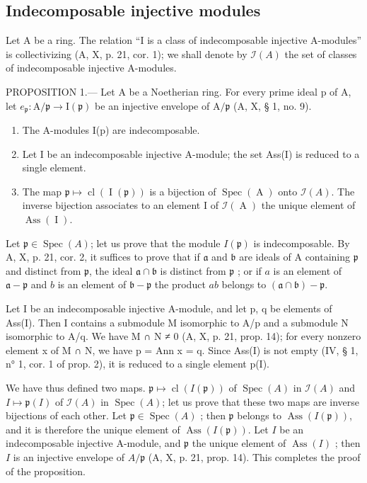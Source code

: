 \subsection{Indecomposable injective modules}

Let A be a ring. The relation “I is a class of indecomposable injective A-modules” is collectivizing (A, X, p. 21, cor. 1); we shall denote by \(\mathcal{I}(A)\) the set of classes of indecomposable injective A-modules.

PROPOSITION 1.--- Let A be a Noetherian ring. For every prime ideal p of A, let \(e_{\mathfrak{p}}: \mathrm{A}/\mathfrak{p} \to \mathrm{I}(\mathfrak{p})\) be an injective envelope of \(\mathrm{A}/\mathfrak{p}\) (A, X, § 1, no. 9).

\begin{enumerate}
\def\labelenumi{\alph{enumi})}
\item
  The A-modules I(p) are indecomposable.
\item
  Let I be an indecomposable injective A-module; the set Ass(I) is reduced to a single element.
\item
  The map \(\mathfrak{p} \mapsto \operatorname{cl}(\operatorname{I}(\mathfrak{p}))\) is a bijection of \(\operatorname{Spec}(\operatorname{A})\) onto \(\mathcal{I}(A)\). The inverse bijection associates to an element I of \(\mathcal{I}(\operatorname{A})\) the unique element of \(\operatorname{Ass}(\operatorname{I})\).
\end{enumerate}

Let \(\mathfrak{p} \in \operatorname{Spec}(A)\); let us prove that the module \(I(\mathfrak{p})\) is indecomposable. By A, X, p. 21, cor. 2, it suffices to prove that if \(\mathfrak{a}\) and \(\mathfrak{b}\) are ideals of A containing \(\mathfrak{p}\) and distinct from \(\mathfrak{p}\), the ideal \(\mathfrak{a} \cap \mathfrak{b}\) is distinct from \(\mathfrak{p}\) ; or if \(a\) is an element of \(\mathfrak{a} - \mathfrak{p}\) and \(b\) is an element of \(\mathfrak{b} - \mathfrak{p}\) the product \(ab\) belongs to \((\mathfrak{a} \cap \mathfrak{b}) - \mathfrak{p}\).

Let I be an indecomposable injective A-module, and let p, q be elements of Ass(I). Then I contains a submodule M isomorphic to A/p and a submodule N isomorphic to A/q. We have M ∩ N ≠ 0 (A, X, p. 21, prop. 14); for every nonzero element x of M ∩ N, we have p = Ann x = q. Since Ass(I) is not empty (IV, § 1, n° 1, cor. 1 of prop. 2), it is reduced to a single element p(I).

We have thus defined two maps. \(\mathfrak{p} \mapsto \operatorname{cl}(I(\mathfrak{p}))\) of \(\operatorname{Spec}(A)\) in \(\mathcal{I}(A)\) and \(I \mapsto \mathfrak{p}(I)\) of \(\mathcal{I}(A)\) in \(\operatorname{Spec}(A)\); let us prove that these two maps are inverse bijections of each other. Let \(\mathfrak{p} \in \operatorname{Spec}(A)\) ; then \(\mathfrak{p}\) belongs to \(\operatorname{Ass}(I(\mathfrak{p}))\), and it is therefore the unique element of \(\operatorname{Ass}(I(\mathfrak{p}))\). Let \(I\) be an indecomposable injective A-module, and \(\mathfrak{p}\) the unique element of \(\operatorname{Ass}(I)\) ; then \(I\) is an injective envelope of \(A/\mathfrak{p}\) (A, X, p. 21, prop. 14). This completes the proof of the proposition.

